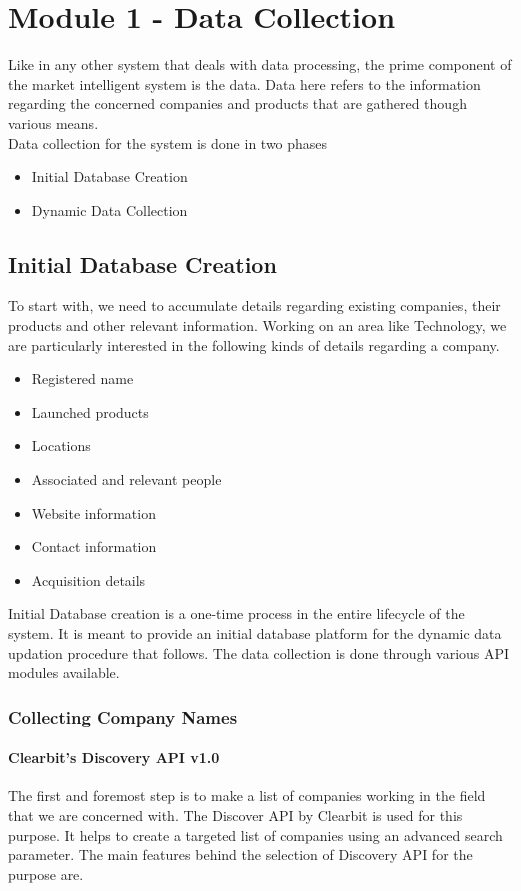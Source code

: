 \section{Module 1 - Data Collection}
\par Like in any other system that deals with data processing, the prime component of the market intelligent system is the data. Data here refers to the information regarding the concerned companies and products that are gathered though various means.\\
Data collection for the system is done in two phases
\begin{itemize}
\item Initial Database Creation
\item Dynamic Data Collection
\end{itemize}
\subsection{Initial Database Creation}
\par To start with, we need to accumulate details regarding existing companies, their products and other relevant information. Working on an area like Technology, we are particularly interested in the following kinds of details regarding a company.
\begin{itemize}
\item Registered name
\item Launched products
\item Locations 
\item Associated and relevant people
\item Website information
\item Contact information
\item Acquisition details
\end{itemize}
\par Initial Database creation is a one-time process in the entire lifecycle of the system. It is meant to provide an initial database platform for the dynamic data updation procedure that follows. The data collection is done through various API modules available.

\subsubsection{Collecting Company Names}
\paragraph*{Clearbit’s Discovery API v1.0}
\hfill \break 
The first and foremost step is to make a list of companies working in the field that we are concerned with. The Discover API by Clearbit is used for this purpose. It helps to create a targeted list of companies using an advanced search parameter. The main 	features behind the selection of Discovery API for the purpose are.	

